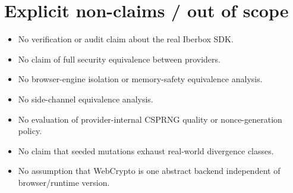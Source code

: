 \documentclass[11pt,a4paper]{article}
\begin{document}
\section{Explicit non-claims / out of scope}
\begin{itemize}
\item No verification or audit claim about the real Iberbox SDK.
\item No claim of full security equivalence between providers.
\item No browser-engine isolation or memory-safety equivalence analysis.
\item No side-channel equivalence analysis.
\item No evaluation of provider-internal CSPRNG quality or nonce-generation policy.
\item No claim that seeded mutations exhaust real-world divergence classes.
\item No assumption that WebCrypto is one abstract backend independent of browser/runtime version.
\end{itemize}
\end{document}
